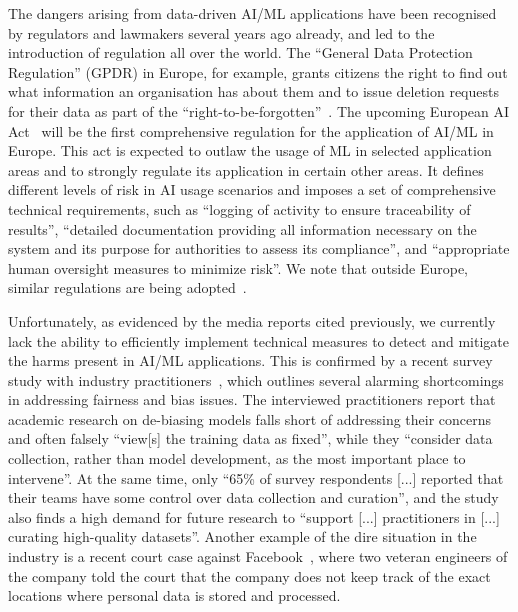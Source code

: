  The dangers arising from data-driven AI/ML applications have been recognised by regulators and lawmakers several years ago already, and led to the introduction of regulation all over the world. The ``General Data Protection Regulation'' (GPDR) in Europe, for example, grants citizens the right to find out what information an organisation has about them and to issue deletion requests for their data as part of the ``right-to-be-forgotten''~\cite{GDPRart17,GDPRrec74}. The upcoming European AI Act~\cite{euaiact} will be the first comprehensive regulation for the application of AI/ML in Europe. This act is expected to outlaw the usage of ML in selected application areas and to strongly regulate its application in certain other areas. It defines different levels of risk in AI usage scenarios and imposes a set of comprehensive technical requirements, such as ``logging of activity to ensure traceability of results'', ``detailed documentation providing all information necessary on the system and its purpose for authorities to assess its compliance'', and ``appropriate human oversight measures to minimize risk''. We note that outside Europe, similar regulations are being adopted~\cite{cppa,digichina}.

 Unfortunately, as evidenced by the media reports cited previously, we currently lack the ability to efficiently implement technical measures to detect and mitigate the harms present in AI/ML applications. This is confirmed by a recent survey study with industry practitioners~\cite{holstein2019improving}, which outlines several alarming shortcomings in addressing fairness and bias issues. The interviewed practitioners report that academic research on de-biasing models falls short of addressing their concerns and often falsely ``view[s] the training data as fixed'', while they ``consider data collection, rather than model development, as the most important place to intervene''. At the same time, only ``65\% of survey respondents [...] reported that their teams have some control over data collection and curation'', and the study also finds a high demand for future research to ``support [...] practitioners in [...] curating high-quality datasets''. Another example of the dire situation in the industry is a recent court case against Facebook~\cite{facebookdata}, where two veteran engineers of the company told the court that the company does not keep track of the exact locations where personal data is stored and processed.

